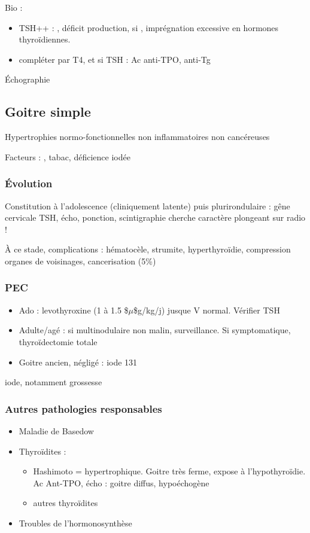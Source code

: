 \documentclass[11pt]{article}
\begin{document}
Bio : 
\begin{itemize}
\item TSH++ : \inc, déficit production, si \dec, imprégnation excessive en hormones thyroïdiennes.
\item compléter par T4, et si TSH \inc : Ac anti-TPO, anti-Tg
\end{itemize}

Échographie

\subsection{Goitre simple}
\label{sec:org1d6e2bc}
Hypertrophies normo-fonctionnelles non inflammatoires non cancéreuses

Facteurs : \female, tabac, déficience iodée

\subsubsection{Évolution}
\label{sec:org692f4a0}
Constitution à l'adolescence (cliniquement latente) puis plurirondulaire : gêne
cervicale \thus TSH, écho, ponction, scintigraphie
\danger cherche caractère plongeant sur radio !

À ce stade, complications : hématocèle, strumite, hyperthyroïdie, compression
organes de voisinages, cancerisation (5\%)

\subsubsection{PEC}
\label{sec:org073c615}
\begin{itemize}
\item Ado : levothyroxine (1 à 1.5 \$\(\mu\)\$g/kg/j) jusque V normal. Vérifier TSH
\item Adulte/agé : si multinodulaire non malin, surveillance. Si symptomatique,
thyroïdectomie totale
\item Goitre ancien, négligé : iode 131
\end{itemize}
\inc iode, notamment grossesse

\subsubsection{Autres pathologies responsables}
\label{sec:org28f2498}
\begin{itemize}
\item Maladie de Basedow
\item Thyroïdites : 
\begin{itemize}
\item Hashimoto = hypertrophique. Goitre très ferme, expose à l'hypothyroïdie. Ac Ant-TPO\inc\inc{}, écho : goitre diffus, hypoéchogène
\item autres thyroïdites
\end{itemize}
\item Troubles de l'hormonosynthèse
\end{itemize}
\end{document}
